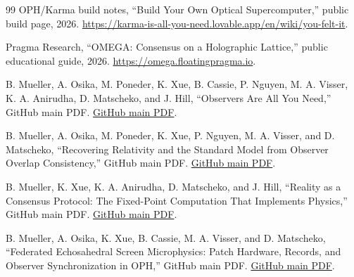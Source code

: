 \documentclass[11pt]{article}
\theoremstyle{definition}
\theoremstyle{remark}
\begin{document}
\begin{thebibliography}{99}
OPH/Karma build notes,
``Build Your Own Optical Supercomputer,''
public build page, 2026.
\url{https://karma-is-all-you-need.lovable.app/en/wiki/you-felt-it}.

Pragma Research,
``OMEGA: Consensus on a Holographic Lattice,''
public educational guide, 2026.
\url{https://omega.floatingpragma.io}.

B. Mueller, A. Osika, M. Poneder, K. Xue, B. Cassie, P. Nguyen, M. A. Visser, K. A. Anirudha, D. Matscheko, and J. Hill,
``Observers Are All You Need,''
GitHub main PDF.
\href{https://github.com/FloatingPragma/observer-patch-holography/blob/main/paper/observers_are_all_you_need.pdf}{GitHub main PDF}.

B. Mueller, A. Osika, M. Poneder, K. Xue, P. Nguyen, M. A. Visser, and D. Matscheko,
``Recovering Relativity and the Standard Model from Observer Overlap
Consistency,''
GitHub main PDF.
\href{https://github.com/FloatingPragma/observer-patch-holography/blob/main/paper/recovering_relativity_and_standard_model_structure_from_observer_overlap_consistency_compact.pdf}{GitHub main PDF}.

B. Mueller, K. Xue, K. A. Anirudha, D. Matscheko, and J. Hill,
``Reality as a Consensus Protocol: The Fixed-Point Computation That Implements Physics,''
GitHub main PDF.
\href{https://github.com/FloatingPragma/observer-patch-holography/blob/main/paper/reality_as_consensus_protocol.pdf}{GitHub main PDF}.

B. Mueller, A. Osika, K. Xue, B. Cassie, M. A. Visser, and D. Matscheko,
``Federated Echosahedral Screen Microphysics: Patch Hardware, Records, and Observer Synchronization in OPH,''
GitHub main PDF.
\href{https://github.com/FloatingPragma/observer-patch-holography/blob/main/paper/screen_microphysics_and_observer_synchronization.pdf}{GitHub main PDF}.

\end{thebibliography}
\end{document}
